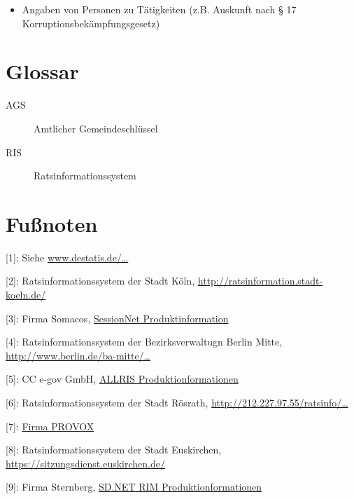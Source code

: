 \begin{itemize}
\item
  Angaben von Personen zu Tätigkeiten (z.B. Auskunft nach § 17
  Korruptionsbekämpfungsgesetz)
\end{itemize}

\section{Glossar}

\begin{description}
\item[AGS]
Amtlicher Gemeindeschlüssel
\item[RIS]
Ratsinformationssystem
\end{description}

\section{Fußnoten}

{[}1{]}: Siehe
\href{https://www.destatis.de/DE/Methoden/Klassifikationen/Bevoelkerung/StaatsangehoerigkeitGebietsschluessel.html}{www.destatis.de/\ldots{}}

{[}2{]}: Ratsinformationssystem der Stadt Köln,
\href{http://ratsinformation.stadt-koeln.de/}{http://ratsinformation.stadt-koeln.de/}

{[}3{]}: Firma Somacos,
\href{http://www.somacos.de/de/sitzungsdienst/ratsinfo.html}{SessionNet
Produktinformation}

{[}4{]}: Ratsinformationssystem der Bezirksverwaltugn Berlin Mitte,
\href{http://www.berlin.de/ba-mitte/bvv-online/allris.net.asp}{http://www.berlin.de/ba-mitte/\ldots{}}

{[}5{]}: CC e-gov GmbH, \href{http://www.cc-egov.de/allris.htm}{ALLRIS
Produktionformationen}

{[}6{]}: Ratsinformationssystem der Stadt Rösrath,
\href{http://212.227.97.55/ratsinfo/roesrath}{http://212.227.97.55/ratsinfo/\ldots{}}

{[}7{]}: \href{http://www.provox.de/}{Firma PROVOX}

{[}8{]}: Ratsinformationssystem der Stadt Euskirchen,
\href{https://sitzungsdienst.euskirchen.de/}{https://sitzungsdienst.euskirchen.de/}

{[}9{]}: Firma Sternberg,
\href{http://www.sitzungsdienst.net/produkte/ratsinformationsmanagement}{SD.NET
RIM Produktionformationen}
